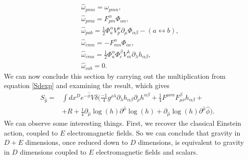 \documentclass{article}
\begin{document}
\begin{subequations}
\begin{align}
&\hat\omega_{pmn} = \omega_{pmn},\\
&\hat \omega_{pma} = F^{\alpha}_{pm}\Phi_{\alpha a},\\
&\hat\omega_{pab} = \frac{1}{2}\Phi^\alpha_aV^\mu_p\partial_\mu\Phi_{\alpha \beta} - (a \leftrightarrow b),\\
&\hat\omega_{cmn} = - F^{\alpha}_{mn}\Phi_{\alpha c},\\
&\hat\omega_{cma} = \frac{1}{2}\Phi^\alpha_a \Phi^\beta_cV^\lambda_m\partial_\lambda h_{\alpha \beta},\\
&\hat \omega_{cab}  = 0.
\end{align}
\end{subequations}
We can now conclude this section by carrying out the multiplication from equation \eqref{Sdexp} and examining the result, which gives
\begin{equation}
    \boxed{
    \begin{aligned}
    S_{\hat g} = &\int d x^D e^{-\hat \phi} V \delta \Big( 
    \frac{-1}{4} g^{\rho \lambda} \partial_\lambda h_{\alpha \beta}\partial_\rho h^{\alpha \beta}
    +\frac{1}{4}F^{\mu \nu \alpha}F^{\beta}_{\mu  \nu}h_{\alpha \beta}+\\
    &+ R + \frac{1}{4} \partial_{\hat \mu} \log(h) \partial^{\hat \mu} \log(h) + \partial_{\hat \mu} \log(h) \partial^{\hat \mu} \hat \phi \Big).
\end{aligned}}
\end{equation}
We can observe some interesting things. First, we recover the classical Einstein action, coupled to $E$ electromagnetic fields. So we can conclude that gravity in $D + E $ dimensions, once reduced down to $D$ dimensions, is equivalent to gravity in $D$ dimensions coupled to $E$ electromagnetic fields and scalars.
\end{document}
